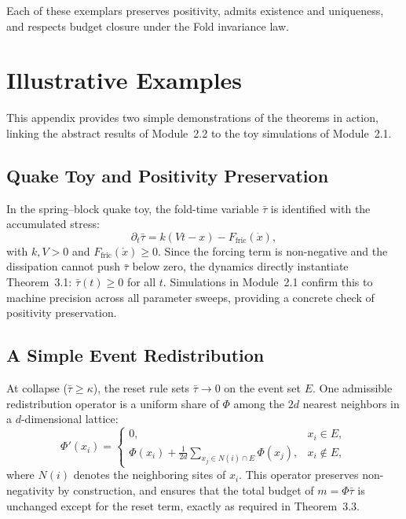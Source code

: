 \documentclass[11pt]{article}
\begin{document}
Each of these exemplars preserves positivity, admits existence and uniqueness, 
and respects budget closure under the Fold invariance law.


\section{Illustrative Examples}

This appendix provides two simple demonstrations of the theorems in action, linking the abstract results of Module~2.2 to the toy simulations of Module~2.1.

\subsection{Quake Toy and Positivity Preservation}
In the spring--block quake toy, the fold-time variable $\bar{\tau}$ is identified with the accumulated stress:
\[
\partial_t \bar{\tau} = k (Vt - x) - F_{\mathrm{fric}}(\dot{x}),
\]
with $k,V>0$ and $F_{\mathrm{fric}}(\dot{x})\ge 0$.  
Since the forcing term is non-negative and the dissipation cannot push $\bar{\tau}$ below zero, the dynamics directly instantiate Theorem~3.1: $\bar{\tau}(t)\ge 0$ for all $t$.  
Simulations in Module~2.1 confirm this to machine precision across all parameter sweeps, providing a concrete check of positivity preservation.

\subsection{A Simple Event Redistribution}
At collapse ($\bar{\tau}\ge\kappa$), the reset rule sets $\bar{\tau}\to 0$ on the event set $E$.  
One admissible redistribution operator is a uniform share of $\Phi$ among the $2d$ nearest neighbors in a $d$-dimensional lattice:
\[
\Phi'(x_i) =
\begin{cases}
0, & x_i \in E, \\[6pt]
\Phi(x_i) + \tfrac{1}{2d} \!\!\!\!\! \sum\limits_{x_j\in N(i)\cap E} \!\!\!\!\! \Phi(x_j), & x_i \notin E,
\end{cases}
\]
where $N(i)$ denotes the neighboring sites of $x_i$.  
This operator preserves non-negativity by construction, and ensures that the total budget of $m=\Phi \bar{\tau}$ is unchanged except for the reset term, exactly as required in Theorem~3.3.  

\end{document}
